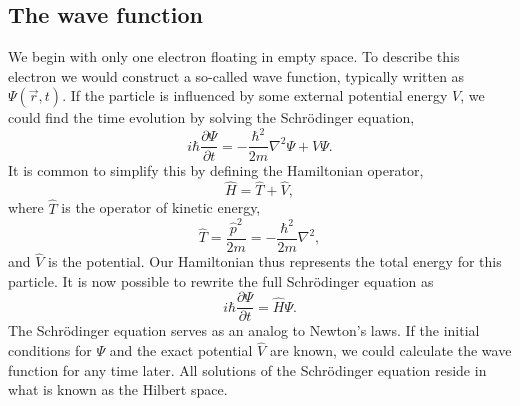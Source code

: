 \subsection{The wave function}
We begin with only one electron floating in empty space.
To describe this electron we would construct a so-called wave function,
typically written as $\Psi(\vec{r},t)$.
If the particle is influenced by some external potential energy $V$, we could find
the time evolution by solving the Schrödinger equation,
\begin{equation}
\label{eq:qm:schrodinger}
i\hbar \frac{\partial \Psi}{\partial t} = - \frac{\hbar^2}{2m}
\nabla^2 \Psi+ V \Psi .
\end{equation}
It is common to simplify this by defining the Hamiltonian operator,
\begin{equation}
\hat{H} = \hat{T} + \hat{V},
\end{equation}
where $\hat{T}$ is the operator of kinetic energy,
\begin{equation}
\hat{T} = \frac{\hat{p}^2}{2m} = - \frac{\hbar^2}{2m} \nabla^2,
\end{equation}
and $\hat{V}$ is the potential. 
Our Hamiltonian thus represents the total energy for this particle.
It is now possible to rewrite the full Schrödinger equation as
\begin{equation}
\label{eq:qm:schrodingersimple}
i\hbar \frac{\partial \Psi}{\partial t} = \hat{H} \Psi .
\end{equation}
The Schrödinger equation serves as an analog to Newton's laws.
If the initial conditions for $\Psi$ and the exact potential $\hat{V}$ are known, 
we could calculate the wave function for any time later.
All solutions of the Schrödinger equation reside in what is known as the Hilbert
space.


